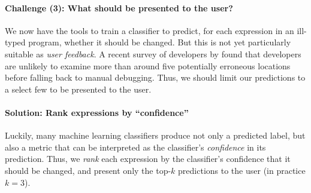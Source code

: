 \paragraph{\textbf{Challenge (3): What should be presented to the user?}}
We now have the tools to train a classifier to predict, for each
expression in an ill-typed program, whether it should be changed.
%
But this is not yet particularly suitable as \emph{user feedback}.
%
A recent survey of developers by \citet{Kochhar2016-oc} found that
developers are unlikely to examine more than around five potentially
erroneous locations before falling back to manual debugging.
%
Thus, we should limit our predictions to a select few to be presented to
the user.

\paragraph{\textbf{Solution: Rank expressions by ``confidence''}}
Luckily, many machine learning classifiers produce not only a predicted
label, but also a metric that can be interpreted as the classifier's
\emph{confidence} in its prediction.
%
Thus, we \emph{rank} each expression by the classifier's confidence that
it should be changed, and present only the top-$k$ predictions to the
user (in practice $k=3$).



